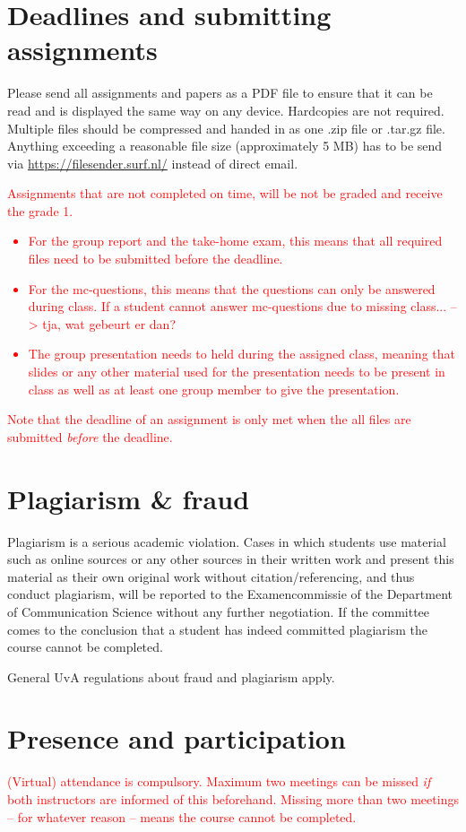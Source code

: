 \documentclass[a4paper,10pt,twocolumn]{report}
\begin{document}
	\section{Deadlines and submitting assignments}
	Please send all assignments and papers as a PDF file to ensure that it can be read and is displayed the same way on any device. Hardcopies are not required. Multiple files should be compressed and handed in as one .zip file or .tar.gz file. Anything exceeding a reasonable file size (approximately 5 MB) has to be send via \url{https://filesender.surf.nl/} instead of direct email. \\
	
	\textcolor{red}{Assignments that are not completed on time, will be not be graded and receive the grade 1. 
		\begin{itemize}
			\item For the group report and the take-home exam, this means that all required files need to be submitted before the deadline. 
			\item For the mc-questions, this means that the questions can only be answered during class. If a student cannot answer mc-questions due to missing class... --> tja, wat gebeurt er dan?
			\item The group presentation needs to held during the assigned class, meaning that slides or any other material used for the presentation needs to be present in class as well as at least one group member to give the presentation. 
		\end{itemize}
		Note that the deadline of an assignment is only met when the all files are submitted \emph{before} the deadline.}

	\section{Plagiarism \& fraud}
	Plagiarism is a serious academic violation. Cases in which students use material such as online sources or any other sources in their written work and present this material as their own original work without citation/referencing, and thus conduct plagiarism, will be reported to the Examencommissie of the Department of Communication Science without any further negotiation. If the committee comes to the conclusion that a student has indeed committed plagiarism the course cannot be completed. 

	General UvA regulations about fraud and plagiarism apply.

	\section{Presence and participation}
	\textcolor{red}{(Virtual) attendance is compulsory. Maximum two meetings can be missed \emph{if} both instructors are informed of this beforehand. Missing more than two meetings – for whatever reason – means the course cannot be completed.} 
	
\end{document}
